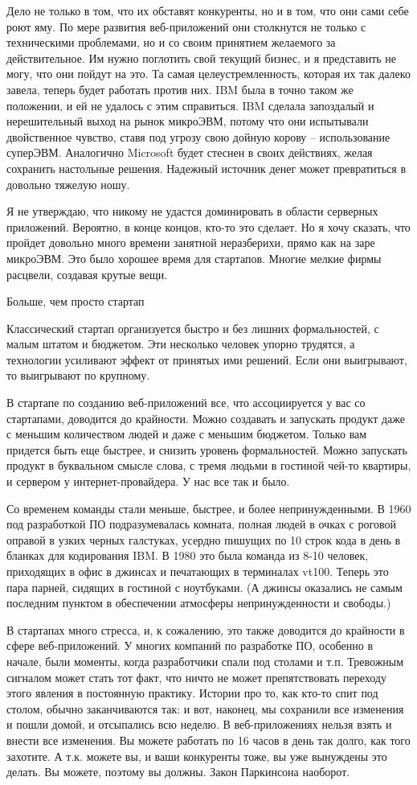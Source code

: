 \documentclass[ebook,12pt,oneside,openany]{memoir}
\begin{document}
Дело не только в том, что их обставят конкуренты, но и в том, что они
сами себе роют яму. По мере развития веб-приложений они столкнутся не
только с техническими проблемами, но и со своим принятием желаемого за
действительное. Им нужно поглотить свой текущий бизнес, и я
представить не могу, что они пойдут на это. Та самая
целеустремленность, которая их так далеко завела, теперь будет
работать против них. IBM была в точно таком же положении, и ей не
удалось с этим справиться. IBM сделала запоздалый и нерешительный
выход на рынок микроЭВМ, потому что они испытывали двойственное
чувство, ставя под угрозу свою дойную корову – использование суперЭВМ.
Аналогично Microsoft будет стеснен в своих действиях, желая сохранить
настольные решения. Надежный источник денег может превратиться в
довольно тяжелую ношу.

Я не утверждаю, что никому не удастся доминировать в области серверных
приложений. Вероятно, в конце концов, кто-то это сделает. Но я хочу
сказать, что пройдет довольно много времени занятной неразберихи,
прямо как на заре микроЭВМ. Это было хорошее время для стартапов.
Многие мелкие фирмы расцвели, создавая крутые вещи.

Больше, чем просто стартап

Классический стартап организуется быстро и без лишних формальностей, с
малым штатом и бюджетом. Эти несколько человек упорно трудятся, а
технологии усиливают эффект от принятых ими решений. Если они
выигрывают, то выигрывают по крупному.

В стартапе по созданию веб-приложений все, что ассоциируется у вас со
стартапами, доводится до крайности. Можно создавать и запускать
продукт даже с меньшим количеством людей и даже с меньшим бюджетом.
Только вам придется быть еще быстрее, и снизить уровень формальностей.
Можно запускать продукт в буквальном смысле слова, с тремя людьми в
гостиной чей-то квартиры, и сервером у интернет-провайдера. У нас все
так и было.

Со временем команды стали меньше, быстрее, и более непринужденными. В
1960 под разработкой ПО подразумевалась комната, полная людей в очках
с роговой оправой в узких черных галстуках, усердно пишущих по 10
строк кода в день в бланках для кодирования IBM. В 1980 это была
команда из 8-10 человек, приходящих в офис в джинсах и печатающих в
терминалах vt100. Теперь это пара парней, сидящих в гостиной с
ноутбуками. (А джинсы оказались не самым последним пунктом в
обеспечении атмосферы непринужденности и свободы.)

В стартапах много стресса, и, к сожалению, это также доводится до
крайности в сфере веб-приложений. У многих компаний по разработке ПО,
особенно в начале, были моменты, когда разработчики спали под столами
и т.п. Тревожным сигналом может стать тот факт, что ничто не может
препятствовать переходу этого явления в постоянную практику. Истории
про то, как кто-то спит под столом, обычно заканчиваются так: и вот,
наконец, мы сохранили все изменения и пошли домой, и отсыпались всю
неделю. В веб-приложениях нельзя взять и внести все изменения. Вы
можете работать по 16 часов в день так долго, как того захотите. А
т.к. можете вы, и ваши конкуренты тоже, вы уже вынуждены это делать.
Вы можете, поэтому вы должны. Закон Паркинсона наоборот.
\end{document}
